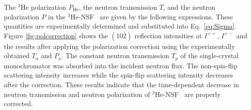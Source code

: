 \documentclass[%
 reprint,
superscriptaddress,
 amsmath,amssymb,
 aps,
]{revtex4-2}
\newcommand{\He}{$^3$He }
\newcommand{\Hensf}{$^3$He-NSF}
\begin{document}
The \He polarization $P_\mathrm{He}$, the neutron transmission $T$, and the neutron polarization $P$ in the \Hensf~ are given by the following expressions.
These quantities are experimentally determined and substituted into Eq.~\ref{eq:Sigma}.
Figure \ref{fig:polcorrection} shows the $(10\bar{2})$ reflection intensities at $I^{++}$, $I^{+-}$ and the results after applying the polarization correction using the experimentally obtained $T_a$ and $P_a$.
The constant neutron transmission $T_p$ of the  single-crystal monochromator was absorbed into the incident neutron flux.
The non-spin-flip scattering intensity increases while the spin-flip scattering intensity decreases after the correction.
These results indicate that the time-dependent decrease in neutron transmission and neutron polarization of \Hensf~ are properly corrected.

\end{document}
